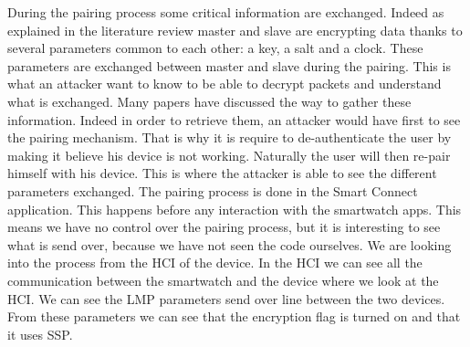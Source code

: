 During the pairing process some critical information are exchanged. Indeed as explained in the literature review master and slave are encrypting data thanks to several parameters common to each other: a key, a salt and a clock. These parameters are exchanged between master and slave during the pairing. This is what an attacker want to know to be able to decrypt packets and understand what is exchanged.
Many papers have discussed the way to gather these information. Indeed in order to retrieve them, an attacker would have first to see the pairing mechanism. That is why it is require to de-authenticate the user by making it believe his device is not working. Naturally the user will then re-pair himself with his device. This is where the attacker is able to see the different parameters exchanged. 
The pairing process is done in the Smart Connect application. This happens before any interaction with the smartwatch apps. This means we have no control over the pairing process, but it is interesting to see what is send over, because we have not seen the code ourselves. 
We are looking into the process from the HCI of the device. In the HCI we can see all the communication between the smartwatch and the device where we look at the HCI. We can see the LMP parameters send over line between the two devices. From these parameters we can see that the encryption flag is turned on and that it uses SSP.